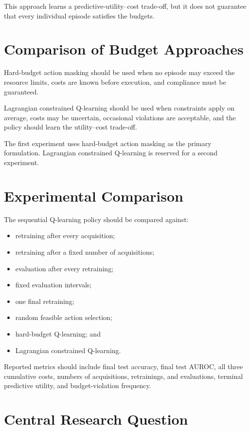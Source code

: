 \documentclass[11pt,letterpaper]{article}
\begin{document}
This approach learns a predictive-utility--cost trade-off, but it does not
guarantee that every individual episode satisfies the budgets.

\section{Comparison of Budget Approaches}

Hard-budget action masking should be used when no episode may exceed the
resource limits, costs are known before execution, and compliance must be
guaranteed.

Lagrangian constrained Q-learning should be used when constraints apply on
average, costs may be uncertain, occasional violations are acceptable, and
the policy should learn the utility--cost trade-off.

The first experiment uses hard-budget action masking as the primary
formulation. Lagrangian constrained Q-learning is reserved for a second
experiment.

\section{Experimental Comparison}

The sequential Q-learning policy should be compared against:
\begin{itemize}[nosep]
    \item retraining after every acquisition;
    \item retraining after a fixed number of acquisitions;
    \item evaluation after every retraining;
    \item fixed evaluation intervals;
    \item one final retraining;
    \item random feasible action selection;
    \item hard-budget Q-learning; and
    \item Lagrangian constrained Q-learning.
\end{itemize}

Reported metrics should include final test accuracy, final test AUROC, all
three cumulative costs, numbers of acquisitions, retrainings, and evaluations,
terminal predictive utility, and budget-violation frequency.

\section{Central Research Question}
\end{document}
